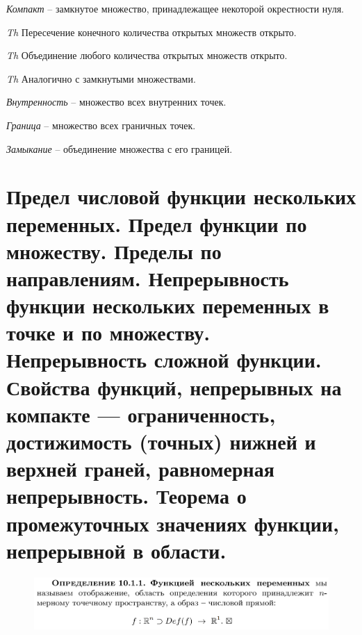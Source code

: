 \documentclass{article}
\newcommand{\ii}{\textit}
\begin{document}
\ii{Компакт} -- замкнутое множество, принадлежащее некоторой окрестности нуля.

\ii{Th} Пересечение конечного количества открытых множеств открыто.

\ii{Th} Объединение любого количества открытых множеств открыто.

\ii{Th} Аналогично с замкнутыми множествами.

\ii{Внутренность} -- множество всех внутренних точек.

\ii{Граница} -- множество всех граничных точек.

\ii{Замыкание} -- объединение множества с его границей.

\newpage\noindent
\section{\color{RedViolet}\textbf{Предел числовой функции нескольких переменных. Предел функции по множеству. Пределы по направлениям. Непрерывность функции нескольких переменных в точке и по множеству. Непрерывность сложной функции. Свойства функций, непрерывных на компакте — ограниченность, достижимость (точных) нижней и верхней граней, равномерная непрерывность. Теорема о промежуточных значениях функции, непрерывной в области.}}
\begin{figure}[h!]
    \centering
    \includegraphics[width=\textwidth]{14.png}
    \vspace{-1cm}
\end{figure}
\begin{figure}[h!]
    \centering
    \vspace{-1cm}
\end{figure}
\begin{figure}[h!]
    \centering
\end{figure}
\end{document}
